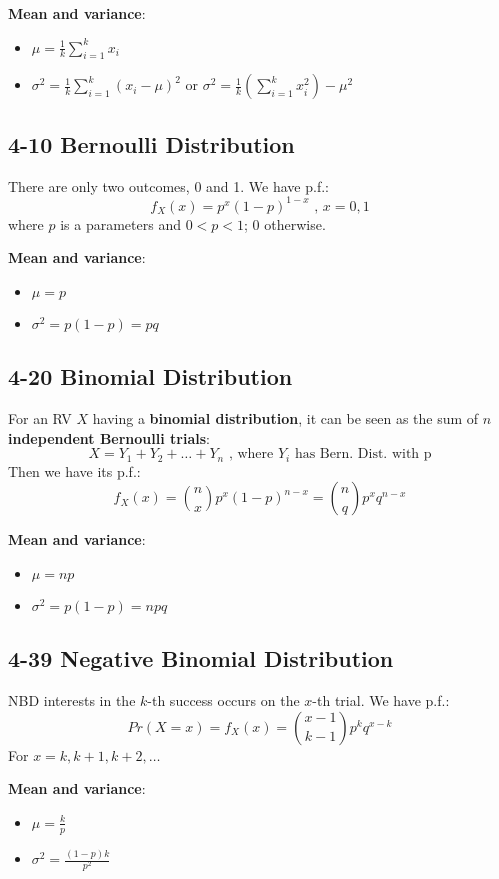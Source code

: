 \documentclass[12pt,landscape]{article}
\begin{document}
\begin{multicols}{3}
    \textbf{Mean and variance}:
    \begin{itemize}
        \item $\mu = \frac{1}{k} \sum_{i=1}^k x_i$
        \item $\sigma^2 = \frac{1}{k}\sum_{i=1}^k (x_i - \mu)^2$ or
            $\sigma^2 = \frac{1}{k}(\sum_{i=1}^k x_i^2) - \mu^2$
    \end{itemize}

    \subsection{4-10 Bernoulli Distribution}
    There are only two outcomes, 0 and 1. We have p.f.:
        $$ f_X(x) = p^x(1-p)^{1-x} \text{ , } x = 0,1 $$
    where $p$ is a parameters and $0 < p < 1$; 0 otherwise.

    \textbf{Mean and variance}:
    \begin{itemize}
        \item $\mu = p$
        \item $\sigma^2 = p(1-p) = pq$
    \end{itemize}

    \subsection{4-20 Binomial Distribution}
    For an RV $X$ having a \textbf{binomial distribution}, it can be seen as the sum of
    $n$ \textbf{independent Bernoulli trials}:
        $$ X = Y_1 + Y_2 + \dots + Y_n \text{ , where $Y_i$ has Bern. Dist. with p} $$
    Then we have its p.f.:
        $$ f_X(x) = {n \choose x}p^x(1-p)^{n-x} = {n \choose q}p^x q^{n-x} $$
    
    \textbf{Mean and variance}:
    \begin{itemize}
        \item $\mu = np$
        \item $\sigma^2 = p(1-p) = npq$
    \end{itemize}
    
    \subsection{4-39 Negative Binomial Distribution}
    NBD interests in the $k$-th success occurs on the $x$-th trial. We have p.f.:
        $$ Pr(X = x) = f_X(x) = {x-1 \choose k-1} p^k q^{x-k} $$
    For $x = k, k+1, k+2, \dots$

    \textbf{Mean and variance}:
    \begin{itemize}
        \item $\mu = \frac{k}{p}$
        \item $\sigma^2 = \frac{(1-p)k}{p^2}$
    \end{itemize}


\end{multicols}
\end{document}
